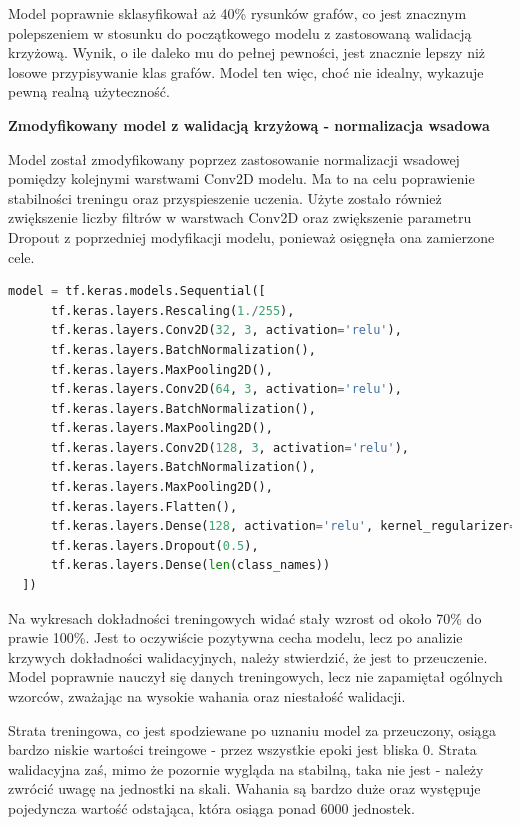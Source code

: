 Model poprawnie sklasyfikował aż 40\% rysunków grafów,
co jest znacznym polepszeniem w stosunku do początkowego modelu z zastosowaną walidacją krzyżową.
Wynik, o ile daleko mu do pełnej pewności, jest znacznie lepszy niż losowe przypisywanie klas grafów.
Model ten więc, choć nie idealny, wykazuje pewną realną użyteczność.

\textbf{Zmodyfikowany model z walidacją krzyżową - normalizacja wsadowa}

Model został zmodyfikowany poprzez zastosowanie normalizacji wsadowej pomiędzy kolejnymi warstwami Conv2D modelu.
Ma to na celu poprawienie stabilności treningu oraz przyspieszenie uczenia.
Użyte zostało również zwiększenie liczby filtrów w warstwach Conv2D oraz zwiększenie parametru Dropout
z poprzedniej modyfikacji modelu, ponieważ osięgnęła ona zamierzone cele.

\begin{lstlisting}[language=Python,caption=Listing zmodyfikowanego skryptu tworzącego model z walidacją krzyżową - wersja 2,
	label={tests-model-crossval2}]
	model = tf.keras.models.Sequential([
      tf.keras.layers.Rescaling(1./255),
      tf.keras.layers.Conv2D(32, 3, activation='relu'),
      tf.keras.layers.BatchNormalization(),
      tf.keras.layers.MaxPooling2D(),
      tf.keras.layers.Conv2D(64, 3, activation='relu'),
      tf.keras.layers.BatchNormalization(),
      tf.keras.layers.MaxPooling2D(),
      tf.keras.layers.Conv2D(128, 3, activation='relu'),
      tf.keras.layers.BatchNormalization(),
      tf.keras.layers.MaxPooling2D(),
      tf.keras.layers.Flatten(),
      tf.keras.layers.Dense(128, activation='relu', kernel_regularizer=tf.keras.regularizers.l2(0.01)),
      tf.keras.layers.Dropout(0.5),
      tf.keras.layers.Dense(len(class_names))
  ])
\end{lstlisting}

Na wykresach dokładności treningowych widać stały wzrost od około 70\% do prawie 100\%.
Jest to oczywiście pozytywna cecha modelu, lecz po analizie krzywych dokładności walidacyjnych,
należy stwierdzić, że jest to przeuczenie. Model poprawnie nauczył się danych treningowych,
lecz nie zapamiętał ogólnych wzorców, zważając na wysokie wahania oraz niestałość walidacji.

Strata treningowa, co jest spodziewane po uznaniu model za przeuczony,
osiąga bardzo niskie wartości treingowe - przez wszystkie epoki jest bliska 0.
Strata walidacyjna zaś, mimo że pozornie wygląda na stabilną, taka nie jest
- należy zwrócić uwagę na jednostki na skali. Wahania są bardzo duże oraz występuje pojedyncza wartość odstająca,
która osiąga ponad 6000 jednostek.

